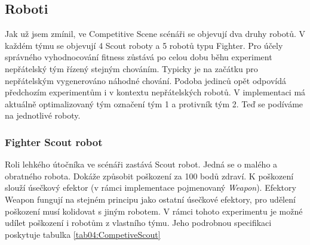 \subsection{Roboti}
Jak už jsem zmínil, ve Competitive Scene scénáři se objevují dva druhy robotů. V každém týmu se objevují 4 Scout roboty a 5 robotů typu Fighter. Pro účely správného vyhodnocování fitness zůstává po celou dobu běhu experiment nepřátelský tým řízený stejným chováním. Typicky je na začátku pro nepřátelským vygenerováno náhodné chování. Podoba jedinců opět odpovídá předchozím experimentům i v kontextu nepřátelských robotů. V implementaci má aktuálně optimalizovaný tým označení tým 1 a protivník tým 2. 
Teď se podíváme na jednotlivé roboty.
\subsubsection{Fighter Scout robot}
Roli lehkého útočníka ve scénáři zastává Scout robot. Jedná se o malého a obratného robota. Dokáže způsobit poškození za 100 bodů zdraví. K poškození slouží úsečkový efektor (v rámci implementace pojmenovaný \textit{Weapon}).  Efektory Weapon fungují na stejném principu jako ostatní úsečkové efektory, pro udělení poškození musí kolidovat s jiným robotem. V rámci tohoto experimentu je možné udílet poškození i robotům z vlastního týmu.  Jeho podrobnou specifikaci poskytuje tabulka \ref{tab04:CompetiveScout}
